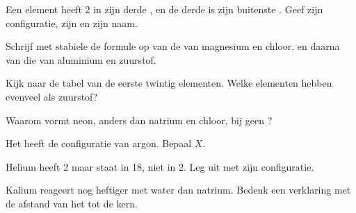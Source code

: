 \begin{exercise}[$\star\star$]\label{exo:g10:electron-shells:7}
Een element heeft 2  in zijn derde , en de derde  is
zijn buitenste . Geef zijn configuratie, zijn  en zijn
naam.
\end{exercise}

\begin{exercise}[$\star\star$]\label{exo:g10:electron-shells:8}
Schrijf met stabiele  de formule op van de  van
magnesium en chloor, en daarna van die van aluminium en zuurstof.
\end{exercise}

\begin{exercise}[$\star\star$]\label{exo:g10:electron-shells:9}
Kijk naar de tabel van de eerste twintig elementen. Welke elementen
hebben evenveel  als zuurstof?
\end{exercise}

\begin{exercise}[$\star\star$]\label{exo:g10:electron-shells:10}
Waarom vormt neon, anders dan natrium en chloor, bij 
geen ?
\end{exercise}

\begin{exercise}[$\star\star$]\label{exo:g10:electron-shells:11}
Het   heeft de configuratie van argon. Bepaal $X$.
\end{exercise}

\begin{exercise}[$\star\star\star$]\label{exo:g10:electron-shells:12}
Helium heeft 2  maar staat in  18, niet in
 2. Leg uit met zijn configuratie.
\end{exercise}

\begin{exercise}[$\star\star\star$]\label{exo:g10:electron-shells:13}
Kalium reageert nog heftiger met water dan natrium. Bedenk een verklaring
met de afstand van het  tot de kern.
\end{exercise}

